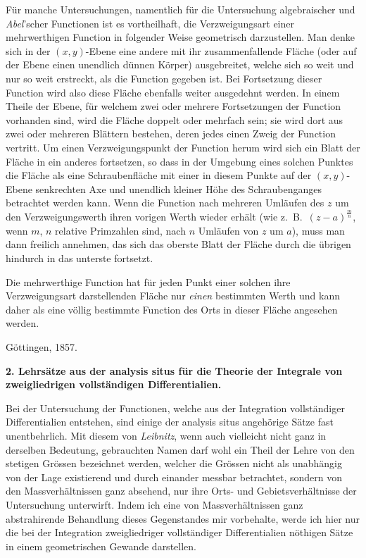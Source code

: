 \documentclass[a4paper,12pt,leqno]{article}
\begin{document}
F\"{u}r manche Untersuchungen, namentlich f\"{u}r die
Untersuchung algebraischer und \emph{Abel}'scher Functionen ist
es vortheilhaft, die Verzweigungsart einer mehrwerthigen Function
in folgender Weise geometrisch darzustellen.  Man denke sich in
der $(x, y)$-Ebene eine andere mit ihr zusammenfallende Fl\"{a}che
\label{`Flaeche'}
(oder auf der Ebene einen unendlich d\"{u}nnen K\"{o}rper)
ausgebreitet, welche sich so weit und nur so weit erstreckt, als
die Function gegeben ist.  Bei Fortsetzung dieser Function wird
also diese Fl\"{a}che ebenfalls weiter ausgedehnt werden.  In
einem Theile der Ebene, f\"{u}r welchem zwei oder mehrere
Fortsetzungen der  Function vorhanden sind, wird die Fl\"{a}che
doppelt oder mehrfach sein; sie wird dort aus zwei oder mehreren
Bl\"{a}ttern bestehen, deren jedes einen Zweig der Function
vertritt.  Um einen Verzweigungspunkt der Function herum wird
sich ein Blatt der Fl\"{a}che in ein anderes fortsetzen, so dass
in der Umgebung eines solchen Punktes die Fl\"{a}che als eine
Schraubenfl\"{a}che mit einer in diesem Punkte auf der
$(x, y)$-Ebene senkrechten Axe und unendlich kleiner H\"{o}he des
Schraubenganges betrachtet werden kann.  Wenn die Function nach
mehreren Uml\"{a}ufen des $z$ um den Verzweigungswerth ihren
vorigen Werth wieder erh\"{a}lt
(wie z.~B.\ $(z - a)^{\frac{m}{n}}$,
wenn $m$, $n$ relative Primzahlen sind, nach $n$ Uml\"{a}ufen von
$z$ um $a$), muss man dann freilich annehmen, das sich das
oberste Blatt der Fl\"{a}che durch die \"{u}brigen hindurch in
das unterste fortsetzt.

Die mehrwerthige Function hat f\"{u}r jeden Punkt einer solchen
ihre Verzweigungsart darstellenden Fl\"{a}che nur \emph{einen}
bestimmten Werth und kann daher als eine v\"{o}llig bestimmte
Function des Orts in dieser Fl\"{a}che angesehen werden.

G\"{o}ttingen, 1857.

\begin{center}
\large\bfseries
2.  Lehrs\"{a}tze aus der analysis situs f\"{u}r die
Theorie der Integrale von zweigliedrigen vollst\"{a}ndigen
Differentialien.
\end{center}

Bei der Untersuchung der Functionen, welche aus der Integration
vollst\"{a}ndiger Differentialien entstehen, sind einige der
analysis situs angeh\"{o}rige S\"{a}tze fast unentbehrlich.  Mit
diesem von \emph{Leibnitz}, wenn auch vielleicht nicht ganz in
derselben Bedeutung, gebrauchten Namen darf wohl ein Theil der
Lehre von den stetigen Gr\"{o}ssen bezeichnet werden, welcher
die Gr\"{o}ssen nicht als unabh\"{a}ngig von der Lage existierend
und durch einander messbar betrachtet, sondern von den
Massverh\"{a}ltnissen ganz absehend, nur ihre Orts- und
Gebietsverh\"{a}ltnisse der Untersuchung unterwirft.  Indem ich
eine von Massverh\"{a}ltnissen ganz abstrahirende Behandlung
dieses Gegenstandes mir vorbehalte, werde ich hier nur die bei der
Integration zweigliedriger vollst\"{a}ndiger Differentialien
n\"{o}thigen S\"{a}tze in einem geometrischen Gewande darstellen.
\end{document}
